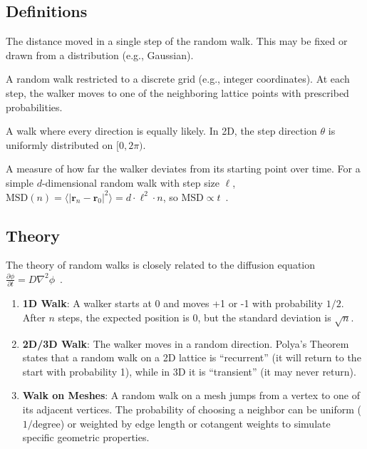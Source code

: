 \subsection{Definitions}
\begin{definition}\label{def:step_size}
The distance moved in a single step of the random walk. This may be fixed or drawn from a distribution (e.g., Gaussian).
\end{definition}

\begin{definition}\label{def:lattice_walk}
A random walk restricted to a discrete grid (e.g., integer coordinates). At each step, the walker moves to one of the neighboring lattice points with prescribed probabilities.
\end{definition}

\begin{definition}\label{def:isotropic_walk}
A walk where every direction is equally likely. In 2D, the step direction $\theta$ is uniformly distributed on $[0, 2\pi)$.
\end{definition}

\begin{definition}\label{def:msd}
A measure of how far the walker deviates from its starting point over time. For a simple $d$-dimensional random walk with step size $\ell$, $\text{MSD}(n) = \langle |\mathbf{r}_n - \mathbf{r}_0|^2 \rangle = d \cdot \ell^2 \cdot n$, so $\text{MSD} \propto t$~\cite{spitzer1976}.
\end{definition}

\subsection{Theory}
The theory of random walks is closely related to the diffusion equation $\frac{\partial \phi}{\partial t} = D \nabla^2 \phi$~\cite{spitzer1976}.
\begin{enumerate}
    \item \textbf{1D Walk}: A walker starts at 0 and moves +1 or -1 with probability $1/2$. After $n$ steps, the expected position is 0, but the standard deviation is $\sqrt{n}$.
    \item \textbf{2D/3D Walk}: The walker moves in a random direction. Polya's Theorem~\cite{polya1921} states that a random walk on a 2D lattice is ``recurrent'' (it will return to the start with probability 1), while in 3D it is ``transient'' (it may never return).
    \item \textbf{Walk on Meshes}: A random walk on a mesh jumps from a vertex to one of its adjacent vertices. The probability of choosing a neighbor can be uniform ($1/\text{degree}$) or weighted by edge length or cotangent weights to simulate specific geometric properties.
\end{enumerate}

